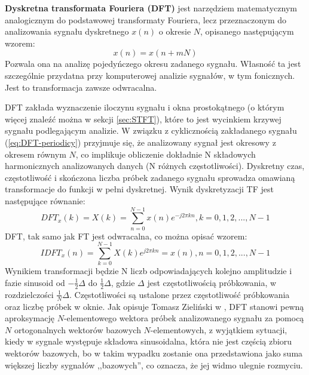 \documentclass[12pt,a4paper,twoside]{mwart}
\begin{document}
\textbf{Dyskretna transformata Fouriera (DFT)} jest narzędziem matematycznym analogicznym do podstawowej transformaty Fouriera, lecz przeznaczonym do analizowania sygnału dyskretnego $x(n)$ o okresie $N$, opisanego następującym wzorem:
\begin{equation} \label{eq:DFT-periodicy}
  x(n) = x(n + mN)
\end{equation}
Pozwala ona na analizę pojedyńczego okresu zadanego sygnału. Własność ta jest szczególnie przydatna przy komputerowej analizie sygnałów, w tym fonicznych. Jest to transformacja zawsze odwracalna. 

DFT zakłada wyznaczenie iloczynu sygnału i okna prostokątnego (o którym więcej znaleźć można w sekcji \ref{sec:STFT}), które to jest wycinkiem krzywej sygnału podlegającym analizie. W związku z cyklicznością zakładanego sygnału (\ref{eq:DFT-periodicy}) przyjmuje się, że analizowany sygnał jest okresowy z okresem równym $N$, co implikuje obliczenie dokładnie N składowych harmonicznych analizowanych danych (N różnych częstotliwości). Dyskretny czas, częstotliwość i skończona liczba próbek zadanego sygnału sprowadza omawianą transformacje do funkcji w pełni dyskretnej. Wynik dyskretyzacji TF jest następujące równanie:
\begin{equation} \label{eq:DFT}
  DFT_x(k) = X(k) = \sum_{n = 0}^{N-1} x(n)e^{-j{2 \pi}kn},  k = 0, 1, 2,..., N-1
\end{equation}
DFT, tak samo jak FT jest odwracalna, co można opisać wzorem:
\begin{equation} \label{eq:IDFT}
  IDFT_x(n) = \sum_{k = 0}^{N-1} X(k)e^{j2\pi kn} = x(n), n = 0, 1, 2,..., N-1
\end{equation}
Wynikiem transformacji będzie N liczb odpowiadających kolejno amplitudzie i fazie sinusoid od $- \frac{1}{2} \Delta $ do $\frac{1}{2} \Delta $, gdzie $\Delta$ jest częstotliwością próbkowania, w rozdzielczości $\frac{1}{N} \Delta$. Częstotliwości są ustalone przez częstotliwość próbkowania oraz liczbę próbek w oknie. Jak opisuje Tomasz Zieliński w 
\cite[198 - 200, 204-206]{CyfrowePrzetwarzanieSygnalowOdTeoriiDoZastosowan}
, DFT stanowi pewną aproksymację $N$-elementowego wektora próbek analizowanego sygnału za pomocą $N$ ortogonalnych wektorów bazowych $N$-elementowych, z wyjątkiem sytuacji, kiedy w sygnale występuje składowa sinusoidalna, która nie jest częścią zbioru wektorów bazowych, bo w takim wypadku zostanie ona przedstawiona jako suma większej liczby sygnałów ,,bazowych'', co oznacza, że jej widmo ulegnie rozmyciu.
\end{document}
